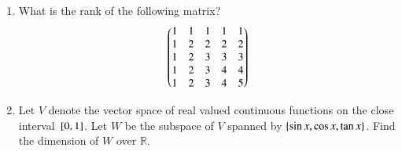 \begin{enumerate}[label=\thesection.\arabic*.,ref=\thesection.\theenumi]
\begin{enumerate}
\end{enumerate}
\item What is the rank of the following matrix?
\begin{align}
\begin{pmatrix}
1 & 1 & 1 & 1 & 1 \\
1 & 2 & 2 & 2 & 2 \\
1 & 2 & 3 & 3 & 3 \\
1 & 2 & 3 & 4 & 4 \\
1 & 2 & 3 & 4 & 5 
\end{pmatrix}
\end{align}
\item Let $V$ denote the vector space of real valued continuous functions on the close interval ${}\left[0,1\right]$.  Let $W$ be the subspace of $V$ spanned by $\left\{\sin x, \cos x, \tan x\right\}$.  Find the dimension of $W$ over $\mathbb{R}$.
\solution



\end{enumerate}
